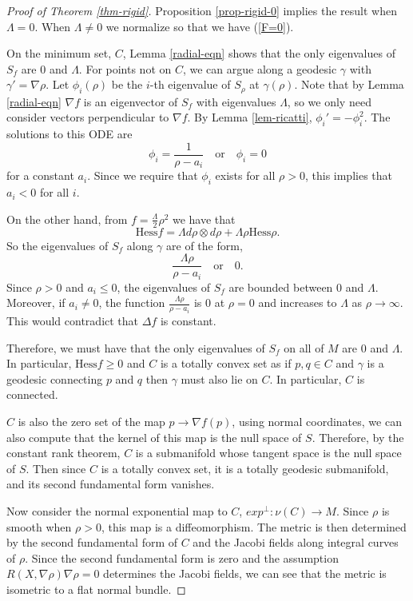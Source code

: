 \documentclass{amsart}
\theoremstyle{plain}
\numberwithin{equation}{section}
\begin{document}
\begin{proof}[Proof of Theorem \ref{thm-rigid}]

Proposition \ref{prop-rigid-0} implies the result when $\Lambda=0$.  When $\Lambda \neq 0$ we normalize so that we have (\ref{F=0}). 

On the minimum set, $C$, Lemma \ref{radial-eqn} shows that the only eigenvalues of $S_f$ are $0$ and $\Lambda$.  For points not on $C$, we can argue along a geodesic $\gamma$ with $\gamma'=\nabla \rho.$  Let $\phi_i(\rho)$ be the $i$-th eigenvalue of $S_{\rho}$ at $\gamma(\rho)$. Note that by Lemma \ref{radial-eqn} $\nabla f$ is an eigenvector of $S_f$ with eigenvalues $\Lambda$, so we only need consider vectors perpendicular to $\nabla f$.   By Lemma \ref{lem-ricatti}, $\phi_i' = -\phi_i^2$.  The solutions to this ODE are 
\[ \phi_i = \frac{1}{\rho-a_i} \quad \text{or} \quad \phi_i = 0\]
for a constant $a_i$. Since we require that $\phi_i$ exists for all $\rho>0$, this implies that $a_i<0$ for all $i$. 

On the other hand, from $f= \frac{\Lambda}{2} \rho^2$ we have that
\[ \mathrm{Hess} f = \Lambda d\rho \otimes d\rho + \Lambda \rho \mathrm{Hess} \rho.\]
So the eigenvalues of $S_f$ along $\gamma$ are of the form, 
\[ \frac{\Lambda \rho}{\rho-a_i} \quad \text{or} \quad 0. \]
Since $\rho>0$ and $a_i\leq 0$, the eigenvalues of $S_f$ are bounded between $0$ and $\Lambda$.  Moreover, if $a_i\neq 0$, the function $\frac{\Lambda \rho}{\rho-a_i}$ is $0$ at $\rho=0$ and increases to $\Lambda$ as $\rho \to \infty$. This would contradict that $\Delta f$ is constant. 

Therefore, we must have that the only eigenvalues of $S_f$ on all of $M$ are $0$ and $\Lambda$. In particular, $\mathrm{Hess} f \geq 0$ and $C$ is a totally convex set as if $p, q \in C$ and $\gamma$ is a geodesic connecting $p$ and $q$ then $\gamma$ must also lie on $C$. In particular, $C$ is connected.   


$C$ is also the zero set of the map $p \to \nabla f(p)$, using normal coordinates, we can also compute that the kernel of this map is the null space of $S$.  Therefore, by the constant rank theorem, $C$ is a submanifold whose tangent space is the null space of $S$.  Then since $C$ is a totally convex set, it is a totally geodesic submanifold, and its second fundamental form vanishes. 

Now consider the normal exponential map to $C$,  $exp^{\perp}: \nu(C) \to M$.  Since $\rho$ is smooth when $\rho>0$, this map is a diffeomorphism.  The metric is then determined by the second fundamental form of $C$ and the Jacobi fields along integral curves of $\rho$.  Since the second fundamental form is zero and the assumption  $R(X, \nabla \rho)\nabla \rho=0$ determines the Jacobi fields,  we can see that the metric is isometric to a flat normal bundle. \end{proof}
\end{document}
